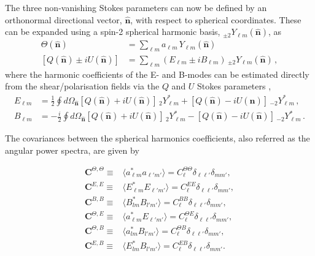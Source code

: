 \qquad The three non-vanishing Stokes parameters can now be defined by an orthonormal directional vector, $\hat{\mathbf{n}}$, with respect to spherical coordinates. These can be expanded using a spin-2 spherical harmonic basis, $_{\pm 2}Y_{\ell m}(\hat{\mathbf{n}})$, as 
\begin{align}
\label{eqn::chCmbPol_stokes_paras}
\Theta(\hat{\mathbf{n}}) &= \sum_{\ell m}a_{\ell m}\,Y_{\ell m}(\hat{\mathbf{n}}) \\
\left[ Q(\hat{\mathbf{n}})\pm iU(\hat{\mathbf{n}}) \right] &= \sum_{\ell m}\left(E_{\ell m}\pm iB_{\ell m} \right)\,_{\pm 2}Y_{\ell m}(\hat{\mathbf{n}})\, ,
\end{align}
\noindent where the harmonic coefficients of the E- and B-modes can be estimated directly from the shear/polarisation fields via the $Q$ and $U$ Stokes parameters \citep{PolSpice2005,Hikage2011},
\begin{align}
E_{\ell m} & = \frac{1}{2}\oint d\Omega_{\hat{\mathbf{n}}} \left[ Q(\hat{\mathbf{n}}) + iU(\hat{\mathbf{n}}) \right]\,_2Y^*_{\ell m} + \left[ Q(\hat{\mathbf{n}}) - iU(\hat{\mathbf{n}}) \right]\,_{-2}Y^*_{\ell m} \, ,\\
B_{\ell m} & = -\frac{i}{2}\oint d\Omega_{\hat{\mathbf{n}}} \left[ Q(\hat{\mathbf{n}}) + iU(\hat{\mathbf{n}}) \right]\,_2Y^*_{\ell m} - \left[ Q(\hat{\mathbf{n}}) - iU(\hat{\mathbf{n}}) \right]\,_{-2}Y^*_{\ell m}\, .
\end{align}

\qquad The covariances between the spherical harmonics coefficients, also referred as the angular power spectra, are given by

\begin{align}
\label{eqn::chCmbPol_psTT}
\textbf{C}^{\Theta,\Theta}  \equiv & \langle a_{\ell m}^{*} a_{\ell'm'} \rangle  = C_{\ell}^{\Theta\Theta}\delta_{\ell\ell'}\delta_{mm'},\\
\label{eqn::chCmbPol_psEE}
\textbf{C}^{E,E} \equiv & \langle E_{\ell m}^{*} E_{\ell'm'} \rangle = C_{\ell}^{EE}\delta_{\ell\ell'}\delta_{mm'},\\
\label{eqn::chCmbPol_psBB}
\textbf{C}^{B,B} \equiv &\langle B_{lm}^{*} B_{l'm'} \rangle = C_{\ell}^{BB}\delta_{\ell\ell'}\delta_{mm'},\\
\label{eqn::chCmbPol_psTE}
\textbf{C}^{\Theta,E} \equiv & \langle a_{\ell m}^{*} E_{\ell'm'} \rangle = C_{\ell}^{\Theta E}\delta_{\ell\ell'}\delta_{mm'}, \\
\textbf{C}^{\Theta,B} \equiv &\langle a_{lm}^{*} B_{l'm'} \rangle = C_{\ell}^{\Theta B}\delta_{\ell\ell'}\delta_{mm'},\\
\textbf{C}^{E,B} \equiv &\langle E_{lm}^{*} B_{l'm'} \rangle = C_{\ell}^{EB}\delta_{\ell\ell'}\delta_{mm'}.
\end{align}


